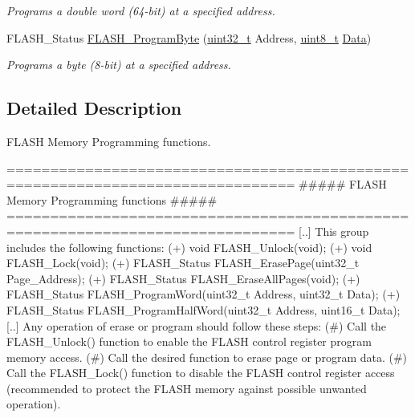 \begin{DoxyCompactItemize}
\begin{DoxyCompactList}\small\item\em Programs a double word (64-\/bit) at a specified address. \end{DoxyCompactList}\item 
F\-L\-A\-S\-H\-\_\-\-Status \hyperlink{group___f_l_a_s_h___group2_gac425adf52fe7f229ef6bb893fe386848}{F\-L\-A\-S\-H\-\_\-\-Program\-Byte} (\hyperlink{stdint_8h_a435d1572bf3f880d55459d9805097f62}{uint32\-\_\-t} Address, \hyperlink{stdint_8h_aba7bc1797add20fe3efdf37ced1182c5}{uint8\-\_\-t} \hyperlink{group___copter_control_b_l_ga6f3335509cc4943e20df66f72483910c}{Data})
\begin{DoxyCompactList}\small\item\em Programs a byte (8-\/bit) at a specified address. \end{DoxyCompactList}\end{DoxyCompactItemize}


\subsection{Detailed Description}
F\-L\-A\-S\-H Memory Programming functions. \begin{DoxyVerb} ===============================================================================
              ##### FLASH Memory Programming functions #####
 ===============================================================================   
    [..] This group includes the following functions:
         (+) void FLASH_Unlock(void);
         (+) void FLASH_Lock(void);
         (+) FLASH_Status FLASH_ErasePage(uint32_t Page_Address);
         (+) FLASH_Status FLASH_EraseAllPages(void);
         (+) FLASH_Status FLASH_ProgramWord(uint32_t Address, uint32_t Data);
         (+) FLASH_Status FLASH_ProgramHalfWord(uint32_t Address, uint16_t Data);
    [..] Any operation of erase or program should follow these steps:
         (#) Call the FLASH_Unlock() function to enable the FLASH control register 
             program memory access.
         (#) Call the desired function to erase page or program data.
         (#) Call the FLASH_Lock() function to disable the FLASH control register 
             access (recommended to protect the FLASH memory against possible 
             unwanted operation).\end{DoxyVerb}


